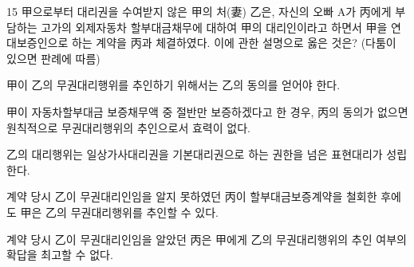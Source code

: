 \begin{question}{15}
甲으로부터 대리권을 수여받지 않은 甲의 처(妻) 乙은, 자신의 오빠 A가 丙에게 부담하는 고가의 외제자동차 할부대금채무에 대하여 甲의 대리인이라고 하면서 甲을 연대보증인으로 하는 계약을 丙과 체결하였다. 이에 관한 설명으로 옳은 것은? (다툼이 있으면 판례에 따름)
\begin{choices}
  \item 甲이 乙의 무권대리행위를 추인하기 위해서는 乙의 동의를 얻어야 한다.
  \item 甲이 자동차할부대금 보증채무액 중 절반만 보증하겠다고 한 경우, 丙의 동의가 없으면 원칙적으로 무권대리행위의 추인으로서 효력이 없다.
  \item 乙의 대리행위는 일상가사대리권을 기본대리권으로 하는 권한을 넘은 표현대리가 성립한다.
  \item 계약 당시 乙이 무권대리인임을 알지 못하였던 丙이 할부대금보증계약을 철회한 후에도 甲은 乙의 무권대리행위를 추인할 수 있다.
  \item 계약 당시 乙이 무권대리인임을 알았던 丙은 甲에게 乙의 무권대리행위의 추인 여부의 확답을 최고할 수 없다.
\end{choices}
\end{question}
